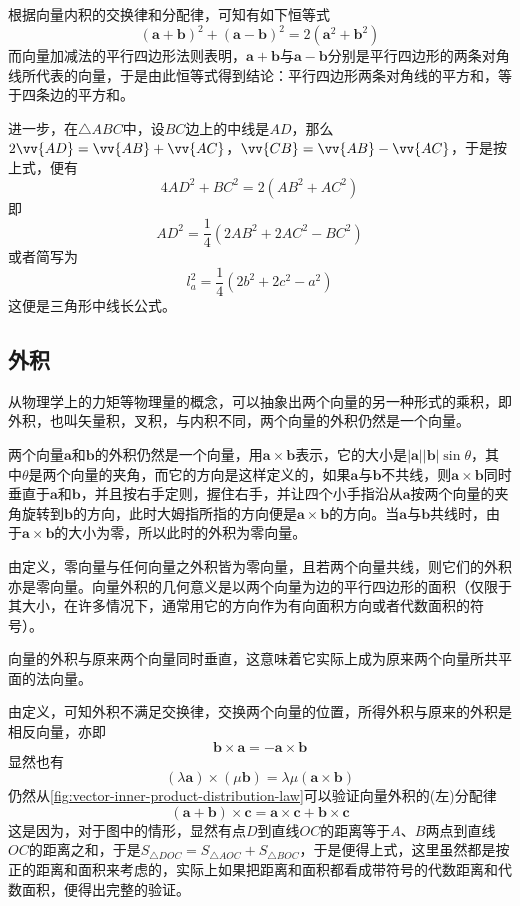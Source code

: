 \begin{example}
  根据向量内积的交换律和分配律，可知有如下恒等式
  \[ (\bm{a}+\bm{b})^2 + (\bm{a}-\bm{b})^2 = 2(\bm{a}^2+\bm{b}^2) \]
而向量加减法的平行四边形法则表明，$\bm{a+b}$与$\bm{a-b}$分别是平行四边形的两条对角线所代表的向量，于是由此恒等式得到结论：平行四边形两条对角线的平方和，等于四条边的平方和。

进一步，在$\triangle ABC$中，设$BC$边上的中线是$AD$，那么$2\vv{AD}=\vv{AB}+\vv{AC}$，$\vv{CB}=\vv{AB}-\vv{AC}$，于是按上式，便有
\[ 4AD^2+BC^2=2(AB^2+AC^2) \]
即
\[ AD^2 = \frac{1}{4}(2AB^2+2AC^2-BC^2) \]
或者简写为
\[ l_a^2 = \frac{1}{4}(2b^2+2c^2-a^2) \]
这便是三角形中线长公式。
\end{example}


\subsection{外积}
\label{sec:outer-product-of-vectors}

从物理学上的力矩等物理量的概念，可以抽象出两个向量的另一种形式的乘积，即外积，也叫矢量积，叉积，与内积不同，两个向量的外积仍然是一个向量。

\begin{definition}
  两个向量$\bm{a}$和$\bm{b}$的外积仍然是一个向量，用$\bm{a}\times\bm{b}$表示，它的大小是$|\bm{a}||\bm{b}|\sin{\theta}$，其中$\theta$是两个向量的夹角，而它的方向是这样定义的，如果$\bm{a}$与$\bm{b}$不共线，则$\bm{a}\times\bm{b}$同时垂直于$\bm{a}$和$\bm{b}$，并且按右手定则，握住右手，并让四个小手指沿从$\bm{a}$按两个向量的夹角旋转到$\bm{b}$的方向，此时大姆指所指的方向便是$\bm{a}\times\bm{b}$的方向。当$\bm{a}$与$\bm{b}$共线时，由于$\bm{a}\times\bm{b}$的大小为零，所以此时的外积为零向量。
\end{definition}

由定义，零向量与任何向量之外积皆为零向量，且若两个向量共线，则它们的外积亦是零向量。向量外积的几何意义是以两个向量为边的平行四边形的面积（仅限于其大小，在许多情况下，通常用它的方向作为有向面积方向或者代数面积的符号）。

向量的外积与原来两个向量同时垂直，这意味着它实际上成为原来两个向量所共平面的法向量。

由定义，可知外积不满足交换律，交换两个向量的位置，所得外积与原来的外积是相反向量，亦即
\[ \bm{b} \times \bm{a} = - \bm{a} \times \bm{b} \]
显然也有
\[ (\lambda \bm{a}) \times (\mu \bm{b}) = \lambda \mu (\bm{a}\times\bm{b}) \]
仍然从\autoref{fig:vector-inner-product-distribution-law}可以验证向量外积的(左)分配律
\[ (\bm{a}+\bm{b}) \times \bm{c} = \bm{a} \times \bm{c} + \bm{b} \times \bm{c} \]
这是因为，对于图中的情形，显然有点$D$到直线$OC$的距离等于$A$、$B$两点到直线$OC$的距离之和，于是$S_{\triangle DOC} = S_{\triangle AOC} + S_{\triangle BOC}$，于是便得上式，这里虽然都是按正的距离和面积来考虑的，实际上如果把距离和面积都看成带符号的代数距离和代数面积，便得出完整的验证。

